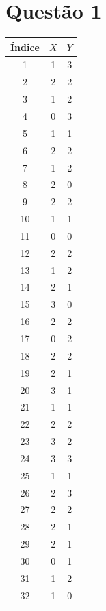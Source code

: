 \section{Questão 1}

\begin{table}
    \centering
    \begin{tabular}{c c c}
    \toprule
        Índice & $X$ & $Y$ \\
    \midrule
         1 & 1 & 3 \\
         2 & 2 & 2 \\
         3 & 1 & 2 \\
         4 & 0 & 3 \\
         5 & 1 & 1 \\
         6 & 2 & 2 \\
         7 & 1 & 2 \\
         8 & 2 & 0 \\
         9 & 2 & 2 \\
        10 & 1 & 1 \\
        11 & 0 & 0 \\
        12 & 2 & 2 \\
        13 & 1 & 2 \\
        14 & 2 & 1 \\
        15 & 3 & 0 \\
        16 & 2 & 2 \\
        17 & 0 & 2 \\
        18 & 2 & 2 \\
        19 & 2 & 1 \\
        20 & 3 & 1 \\
        21 & 1 & 1 \\
        22 & 2 & 2 \\
        23 & 3 & 2 \\ 
        24 & 3 & 3 \\
        25 & 1 & 1 \\
        26 & 2 & 3 \\
        27 & 2 & 2 \\
        28 & 2 & 1 \\
        29 & 2 & 1 \\
        30 & 0 & 1 \\
        31 & 1 & 2 \\
        32 & 1 & 0 \\
    \bottomrule
    \end{tabular}
\end{table}

